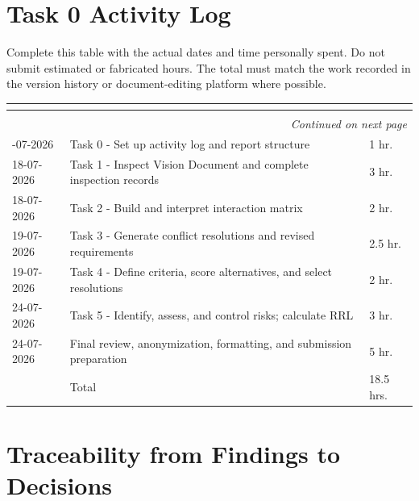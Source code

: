 \documentclass[11pt,a4paper]{article}
\renewcommand{\arraystretch}{1.15}
\begin{document}
\appendix

\section{Task 0 Activity Log}

Complete this table with the actual dates and time personally spent. Do not submit estimated or fabricated hours. The total must match the work recorded in the version history or document-editing platform where possible.

\begin{center}
\small
\setlength{\tabcolsep}{2.5pt}
\renewcommand{\arraystretch}{1.18}
\begin{longtable}{|p{2.8cm}|p{10.5cm}|p{2.5cm}|}
\hline
\rowcolor{headerblue} \textbf{\color{white}{Date}} & \textbf{\color{white}{Task/activity}} & \textbf{\color{white}{Time spent}} \\ \hline
\endfirsthead
\hline
\rowcolor{headerblue} \textbf{\color{white}{Date}} & \textbf{\color{white}{Task/activity}} & \textbf{\color{white}{Time spent}} \\ \hline
\endhead
\hline
\multicolumn{3}{r}{\small\itshape Continued on next page}\\
\endfoot
\hline
\endlastfoot
18-07-2026 & Task 0 - Set up activity log and report structure & 1 hr. \\ \hline
18-07-2026 & Task 1 - Inspect Vision Document and complete inspection records & 3 hr. \\ \hline
18-07-2026 & Task 2 - Build and interpret interaction matrix & 2 hr. \\ \hline
19-07-2026 & Task 3 - Generate conflict resolutions and revised requirements & 2.5 hr. \\ \hline
19-07-2026 & Task 4 - Define criteria, score alternatives, and select resolutions & 2 hr. \\ \hline
24-07-2026 & Task 5 - Identify, assess, and control risks; calculate RRL & 3 hr. \\ \hline
24-07-2026 & Final review, anonymization, formatting, and submission preparation & 5 hr. \\ \hline
 & Total & 18.5 hrs. \\ \hline
\end{longtable}
\end{center}

\section{Traceability from Findings to Decisions}
\end{document}
